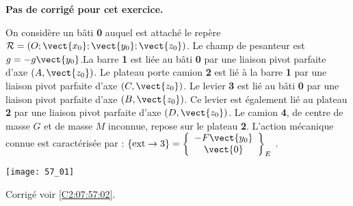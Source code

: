 \normalfalse \difficiletrue \tdifficilefalse
\correctionfalse


\setcounter{numques}{0}
\ifcorrection
\else
\textbf{Pas de corrigé pour cet exercice.}
\fi

\ifprof
\else
On considère un bâti \textbf{0} auquel est attaché le repère$\mathcal{R}=\left(O;\vect{x_0};\vect{y_0};\vect{z_0} \right)$. Le champ de pesanteur est $g=-g\vect{y_0}$.La barre \textbf{1} est liée au bâti \textbf{0} par une liaison pivot parfaite d’axe $\left(A,\vect{z_0}\right)$. Le plateau porte camion \textbf{2} est lié à la barre \textbf{1} par une liaison pivot parfaite d’axe $\left(C,\vect{z_0}\right)$. Le levier \textbf{3} est lié au bâti \textbf{0} par une liaison pivot parfaite d’axe $\left(B,\vect{z_0}\right)$. Ce levier est également lié au plateau \textbf{2} par une liaison pivot parfaite d’axe $\left(D,\vect{z_0}\right)$. Le camion \textbf{4}, de centre de masse $G$ et de masse $M$ inconnue, repose sur le plateau \textbf{2}.
L’action mécanique connue est caractérisée par : $\{\text{ext}\rightarrow 3\}=\left\{
\begin{array}{c}
-F\vect{y_0} \\
\vect{0} \\
\end{array}
\right\}_E$ .


\begin{center}
\texttt{[image: 57\_01]}
\end{center}


\fi

\ifprof
\else
\fi



\ifprof
\else
\fi


\ifprof
\else
\fi


\ifprof
\else
\fi


\ifprof
\else
\fi

\ifprof
\else
\begin{flushright}
\footnotesize{Corrigé voir \ref{C2:07:57:02}.}
\end{flushright}%
\fi